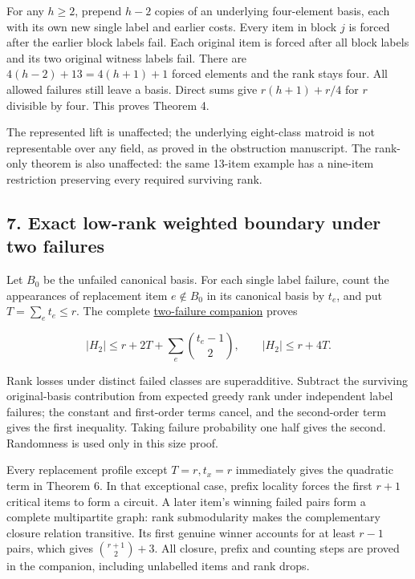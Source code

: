 For any \(h\ge2\), prepend \(h-2\) copies of an underlying four-element basis, each with its own new single label and earlier costs. Every item in block \(j\) is forced after the earlier block labels fail. Each original item is forced after all block labels and its two original witness labels fail. There are \(4(h-2)+13=4(h+1)+1\) forced elements and the rank stays four. All allowed failures still leave a basis. Direct sums give \(r(h+1)+r/4\) for \(r\) divisible by four. This proves Theorem 4.

The represented lift is unaffected; the underlying eight-class matroid is not representable over any field, as proved in the obstruction manuscript. The rank-only theorem is also unaffected: the same 13-item example has a nine-item restriction preserving every required surviving rank.

\hypertarget{af-240b5086c5-exact-low-rank-weighted-boundary-under-two-failures}{%
\subsection{7. Exact low-rank weighted boundary under two failures}\label{af-240b5086c5-exact-low-rank-weighted-boundary-under-two-failures}}

Let \(B_0\) be the unfailed canonical basis. For each single label failure, count the appearances of replacement item \(e\notin B_0\) in its canonical basis by \(t_e\), and put \(T=\sum_e t_e\le r\). The complete \href{https://github.com/icekylinx/algorithm-frontier/blob/main/problems/matroid-failure-summaries/manuscripts/two-failure-oracle-prefix-bounds.md}{two-failure companion} proves

\[
|H_2|\le r+2T+\sum_e\binom{t_e-1}{2},
\qquad |H_2|\le r+4T.
\]

Rank losses under distinct failed classes are superadditive. Subtract the surviving original-basis contribution from expected greedy rank under independent label failures; the constant and first-order terms cancel, and the second-order term gives the first inequality. Taking failure probability one half gives the second. Randomness is used only in this size proof.

Every replacement profile except \(T=r,t_x=r\) immediately gives the quadratic term in Theorem 6. In that exceptional case, prefix locality forces the first \(r+1\) critical items to form a circuit. A later item's winning failed pairs form a complete multipartite graph: rank submodularity makes the complementary closure relation transitive. Its first genuine winner accounts for at least \(r-1\) pairs, which gives \(\binom{r+1}{2}+3\). All closure, prefix and counting steps are proved in the companion, including unlabelled items and rank drops.


